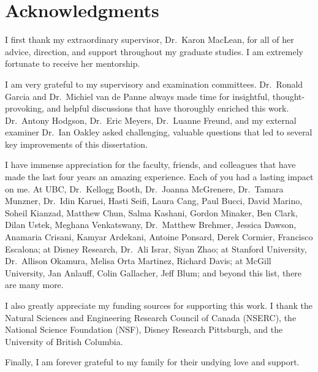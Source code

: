 
\chapter{Acknowledgments}

I first thank my extraordinary supervisor, Dr.~Karon MacLean, for all of her advice, direction, and support throughout my graduate studies.
I am extremely fortunate to receive her mentorship.

I am very grateful to my supervisory and examination committees. Dr.~Ronald Garcia and Dr.~Michiel van de Panne always made time for insightful, thought-provoking, and helpful discussions that have thoroughly enriched this work.
Dr.~Antony Hodgson, Dr.~Eric Meyers, Dr.~Luanne Freund, and my external examiner Dr.~Ian Oakley asked challenging, valuable questions that led to several key improvements of this dissertation.

I have immense appreciation for the faculty, friends, and colleagues that have made the last four years an amazing experience.
Each of you had a lasting impact on me.
At UBC, Dr.~Kellogg Booth, Dr.~Joanna McGrenere, Dr.~Tamara Munzner,
Dr.~Idin Karuei, Hasti Seifi, Laura Cang, Paul Bucci,  David Marino, Soheil Kianzad, Matthew Chun, Salma Kashani, Gordon Minaker, Ben Clark, Dilan Ustek, Meghana Venkatswany, Dr.~Matthew Brehmer, Jessica Dawson, Anamaria Crisani, Kamyar Ardekani, Antoine Ponsard, Derek Cormier, Francisco Escalona;
at Disney Research, Dr.~Ali Israr, Siyan Zhao; 
at Stanford University, Dr.~Allison Okamura, Melisa Orta Martinez, Richard Davis;
at McGill University, Jan Anlauff, Colin Gallacher, Jeff Blum;
and beyond this list, there are many more.

I also greatly appreciate my funding sources for supporting this work.
I thank the Natural Sciences and Engineering Research Council of Canada (NSERC), the National Science Foundation (NSF), Disney Research Pittsburgh, and the University of British Columbia.

Finally, I am forever grateful to my family for their undying love and support.
